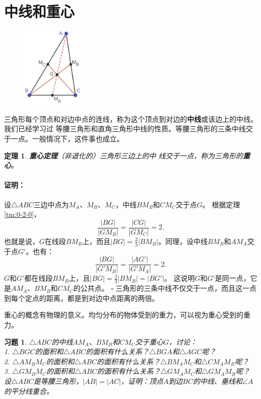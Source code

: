 \documentclass[12pt,UTF8]{ctexbook}
\newtheorem{tm}{定理}[section]
\newenvironment{proof2}{\paragraph{\textbf{证明：}}}{\hfill$\square$}
\newtheorem{xt}{习题}[section]
\begin{document}
\section{中线和重心}
\begin{figure} %
    \vspace{-60pt}
    \includegraphics[width=0.27\textwidth]{三角形重心证明.png}
\end{figure}
三角形每个顶点和对边中点的连线，称为这个顶点到对边的\textbf{中线}或该边上的中线。我们已经学习过
等腰三角形和直角三角形中线的性质。等腰三角形的三条中线交于一点。一般情况下，这件事也成立。

\begin{tm}{\textbf{重心定理}}\label{tm:1-3-0}
    （非退化的）三角形三边上的中
    线交于一点，称为三角形的\textbf{重心}。
\end{tm}
\begin{proof2}
    设$\triangle ABC$三边中点为$M_A$、$M_B$、$M_C$，中线$BM_B$和$CM_C$交于点$G$。
    根据定理\ref{tm:0-2-0}，
    $$\frac{|BG|}{|GM_B|} = \frac{|CG|}{|GM_C|} = 2.$$
    也就是说，$G$在线段$BM_B$上，而且$|BG| = \frac23 |BM_B|$。同理，设中线$BM_B$和$AM_A$交于点$G'$。也有：
    $$\frac{|BG|}{|G'M_B|} = \frac{|AG'|}{|G'M_A|} = 2.$$
    $G$和$G'$都在线段$BM_B$上，且$|BG| = \frac23 |BM_B| = |BG'|$。
    这说明$G$和$G'$是同一点，它是$AM_A$、$BM_B$和$CM_C$的公共点。
\end{proof2}
三角形的三条中线不仅交于一点，而且这一点到每个定点的距离，都是到对边中点距离的两倍。

重心的概念有物理的意义。均匀分布的物体受到的重力，可以视为重心受到的重力。
\begin{xt}\label{xt:1-3-0}
    $\triangle ABC$的中线$AM_A$、$BM_B$和$CM_C$交于重心$G$，讨论：\\
    1. $\triangle BGC$的面积和$\triangle ABC$的面积有什么关系？$\triangle BGA$和$\triangle AGC$呢？\\
    2. $\triangle AM_BM_C$的面积和$\triangle ABC$的面积有什么关系？$\triangle BM_AM_C$和$\triangle CM_AM_B$呢？\\
    3. $\triangle GM_BM_C$的面积和$\triangle ABC$的面积有什么关系？$\triangle GM_AM_C$和$\triangle GM_AM_B$呢？\\
    设$\triangle ABC$是等腰三角形，$|AB| = |AC|$，证明：顶点$A$到边$BC$的中线、垂线和$\angle A$的平分线重合。\\
\end{xt}
\end{document}
